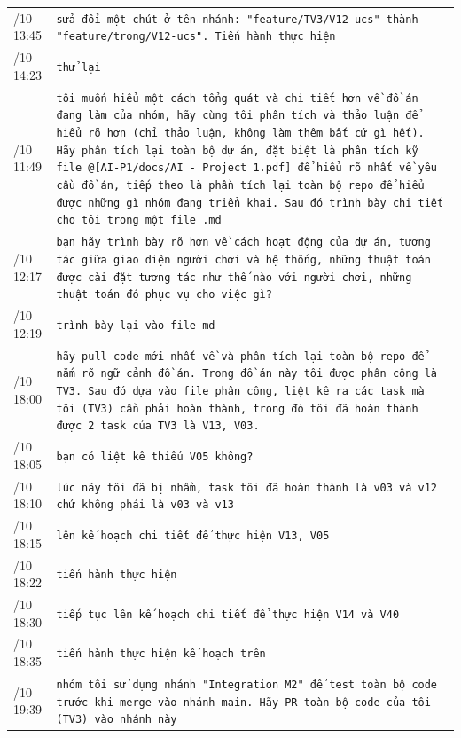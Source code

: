 {\begin{longtable}[]{@{}
  >{\raggedright\arraybackslash}p{}
  >{\raggedright\arraybackslash}p{}@{}}
\rowrule
22/10 13:45 & \texttt{sửa đổi một chút ở tên nhánh: "feature/\allowbreak{}TV3/\allowbreak{}V12-\allowbreak{}ucs" thành "feature/\allowbreak{}trong/\allowbreak{}V12-\allowbreak{}ucs".\allowbreak{} Tiến hành thực hiện} \\
\rowrule
22/10 14:23 & \texttt{thử lại} \\
\rowrule
23/10 11:49 & \texttt{tôi muốn hiểu một cách tổng quát và chi tiết hơn về đồ án đang làm của nhóm, hãy cùng tôi phân tích và thảo luận để hiểu rõ hơn (chỉ thảo luận, không làm thêm bất cứ gì hết).\allowbreak{} Hãy phân tích lại toàn bộ dự án, đặt biệt là phân tích kỹ file @[AI-\allowbreak{}P1/\allowbreak{}docs/\allowbreak{}AI -\allowbreak{} Project 1.\allowbreak{}pdf] để hiểu rõ nhất về yêu cầu đồ án, tiếp theo là phần tích lại toàn bộ repo để hiểu được những gì nhóm đang triển khai.\allowbreak{} Sau đó trình bày chi tiết cho tôi trong một file .\allowbreak{}md} \\
\rowrule
23/10 12:17 & \texttt{bạn hãy trình bày rõ hơn về cách hoạt động của dự án, tương tác giữa giao diện người chơi và hệ thống, những thuật toán được cài đặt tương tác như thế nào với người chơi, những thuật toán đó phục vụ cho việc gì?} \\
\rowrule
23/10 12:19 & \texttt{trình bày lại vào file md} \\
\rowrule
28/10 18:00 & \texttt{hãy pull code mới nhất về và phân tích lại toàn bộ repo để nắm rõ ngữ cảnh đồ án.\allowbreak{} Trong đồ án này tôi được phân công là TV3.\allowbreak{} Sau đó dựa vào file phân công, liệt kê ra các task mà tôi (TV3) cần phải hoàn thành, trong đó tôi đã hoàn thành được 2 task của TV3 là V13, V03.\allowbreak{}} \\
\rowrule
28/10 18:05 & \texttt{bạn có liệt kê thiếu V05 không?} \\
\rowrule
28/10 18:10 & \texttt{lúc nãy tôi đã bị nhầm, task tôi đã hoàn thành là v03 và v12 chứ không phải là v03 và v13} \\
\rowrule
28/10 18:15 & \texttt{lên kế hoạch chi tiết để thực hiện V13, V05} \\
\rowrule
28/10 18:22 & \texttt{tiến hành thực hiện} \\
\rowrule
28/10 18:30 & \texttt{tiếp tục lên kế hoạch chi tiết để thực hiện V14 và V40} \\
\rowrule
28/10 18:35 & \texttt{tiến hành thực hiện kế hoạch trên} \\
\rowrule
28/10 19:39 & \texttt{nhóm tôi sử dụng nhánh "Integration M2" để test toàn bộ code trước khi merge vào nhánh main.\allowbreak{} Hãy PR toàn bộ code của tôi (TV3) vào nhánh này} \\

\end{longtable}}
